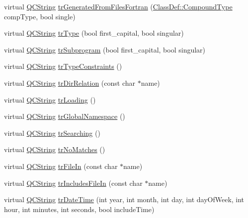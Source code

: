\begin{DoxyCompactItemize}
virtual \mbox{\hyperlink{class_q_c_string}{Q\+C\+String}} \mbox{\hyperlink{class_translator_polish_aabe901b44e851e40a3fe0d7179a9cb79}{tr\+Generated\+From\+Files\+Fortran}} (\mbox{\hyperlink{class_class_def_ae70cf86d35fe954a94c566fbcfc87939}{Class\+Def\+::\+Compound\+Type}} comp\+Type, bool single)
\item 
virtual \mbox{\hyperlink{class_q_c_string}{Q\+C\+String}} \mbox{\hyperlink{class_translator_polish_aee607fc47263657a54f8b0bc5dc992a3}{tr\+Type}} (bool first\+\_\+capital, bool singular)
\item 
virtual \mbox{\hyperlink{class_q_c_string}{Q\+C\+String}} \mbox{\hyperlink{class_translator_polish_a35d361eaaeb396e2a4f622a0c4514f80}{tr\+Subprogram}} (bool first\+\_\+capital, bool singular)
\item 
virtual \mbox{\hyperlink{class_q_c_string}{Q\+C\+String}} \mbox{\hyperlink{class_translator_polish_afad2b5b53339d2799b233bb29ecdf60f}{tr\+Type\+Constraints}} ()
\item 
virtual \mbox{\hyperlink{class_q_c_string}{Q\+C\+String}} \mbox{\hyperlink{class_translator_polish_a6eb8a9fe3923141fb898a3973c113f40}{tr\+Dir\+Relation}} (const char $\ast$name)
\item 
virtual \mbox{\hyperlink{class_q_c_string}{Q\+C\+String}} \mbox{\hyperlink{class_translator_polish_aa1d9901386ec38bae265798731cbfc7d}{tr\+Loading}} ()
\item 
virtual \mbox{\hyperlink{class_q_c_string}{Q\+C\+String}} \mbox{\hyperlink{class_translator_polish_aa90a61c4617148df8f16554588b6ae63}{tr\+Global\+Namespace}} ()
\item 
virtual \mbox{\hyperlink{class_q_c_string}{Q\+C\+String}} \mbox{\hyperlink{class_translator_polish_ab4ed6048856e6dbabeeb8ed58722d7df}{tr\+Searching}} ()
\item 
virtual \mbox{\hyperlink{class_q_c_string}{Q\+C\+String}} \mbox{\hyperlink{class_translator_polish_a94f98c5be6693dd263dc0ff95a042dfa}{tr\+No\+Matches}} ()
\item 
virtual \mbox{\hyperlink{class_q_c_string}{Q\+C\+String}} \mbox{\hyperlink{class_translator_polish_a24b192a77da4973ff6826d3f695732f2}{tr\+File\+In}} (const char $\ast$name)
\item 
virtual \mbox{\hyperlink{class_q_c_string}{Q\+C\+String}} \mbox{\hyperlink{class_translator_polish_a196990beb57f0e7f40361357311205f2}{tr\+Includes\+File\+In}} (const char $\ast$name)
\item 
virtual \mbox{\hyperlink{class_q_c_string}{Q\+C\+String}} \mbox{\hyperlink{class_translator_polish_a1e1a6d5b779d7b0d73863691810b31d9}{tr\+Date\+Time}} (int year, int month, int day, int day\+Of\+Week, int hour, int minutes, int seconds, bool include\+Time)

\end{DoxyCompactItemize}
